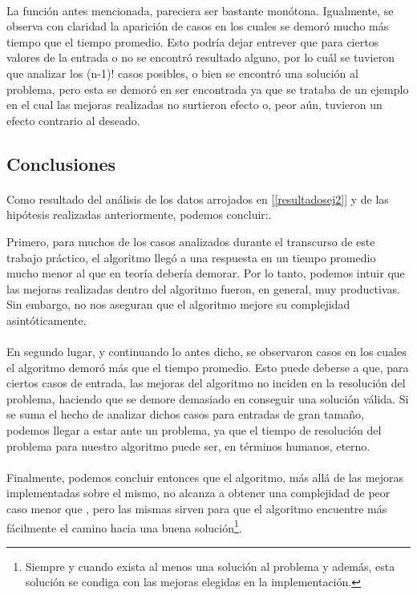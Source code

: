 \paragraph{}
La función antes mencionada, pareciera ser bastante monótona. Igualmente, se observa con claridad la aparición de casos en los cuales se demoró mucho más tiempo que el tiempo promedio. Esto podría dejar entrever que para ciertos valores de la entrada o no se encontró resultado alguno, por lo cuál se tuvieron que analizar los (n-1)! casos posibles, o bien se encontró una solución al problema, pero esta se demoró en ser encontrada ya que se trataba de un ejemplo en el cual las mejoras realizadas no surtieron efecto o, peor aún, tuvieron un efecto contrario al deseado.


\subsection{Conclusiones}

\paragraph{}
Como resultado del análisis de los datos arrojados en [\ref{resultadosej2}] y de las hipótesis realizadas anteriormente, podemos concluir:.

Primero, para muchos de los casos analizados durante el transcurso de este trabajo práctico, el algoritmo llegó a una respuesta en un tiempo promedio mucho menor al que en teoría debería demorar. Por lo tanto, podemos intuir que las mejoras realizadas dentro del algoritmo fueron, en general, muy productivas. Sin embargo, no nos aseguran que el algoritmo mejore su complejidad asintóticamente.

\paragraph{}
En segundo lugar, y continuando lo antes dicho, se observaron casos en los cuales el algoritmo demoró más que el tiempo promedio. Esto puede deberse a que, para ciertos casos de entrada, las mejoras del algoritmo no inciden en la resolución del problema, haciendo que se demore demasiado en conseguir una solución válida. Si se suma el hecho de analizar dichos casos para entradas de gran tamaño, podemos llegar a estar ante un problema, ya que el tiempo de resolución del problema para nuestro algoritmo puede ser, en términos humanos, eterno.

\paragraph{}
Finalmente, podemos concluir entonces que el algoritmo, más allá de las mejoras implementadas sobre el mismo, no alcanza a obtener una complejidad de peor caso menor que , pero las mismas sirven para que el algoritmo encuentre más fácilmente el camino hacia una buena solución\footnote{Siempre y cuando exista al menos una solución al problema y además, esta solución se condiga con las mejoras elegidas en la implementación.}.


